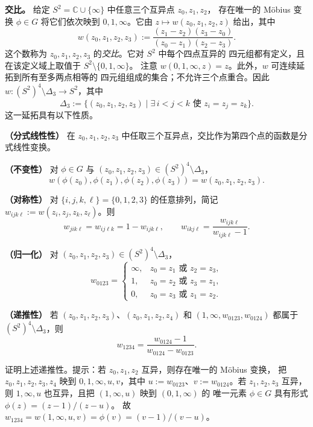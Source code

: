 \noindent\textbf{交比。}
给定 $S^2=\mathbb C\cup\{\infty\}$ 中任意三个互异点 $z_0,z_1,z_2$，
存在唯一的 Möbius 变换 $\phi\in G$ 将它们依次映到 $0,1,\infty$。它由
$z\mapsto w(z_0,z_1,z_2,z)$ 给出，其中
\[
  w(z_0,z_1,z_2,z_3):=
  \frac{(z_1-z_2)(z_3-z_0)}{(z_0-z_1)(z_2-z_3)}.
\]
这个数称为 $z_0,z_1,z_2,z_3$ 的\emph{交比}。它对 $S^2$ 中每个四点互异的
四元组都有定义，且在该定义域上取值于 $S^2\setminus\{0,1,\infty\}$。
注意 $w(0,1,\infty,z)=z$。此外，$w$ 可连续延拓到所有至多两点相等的
四元组组成的集合；不允许三个点重合。因此
$w:(S^2)^4\setminus\Delta_3\to S^2$，其中
\[
  \Delta_3:=\{(z_0,z_1,z_2,z_3)\mid
    \exists\, i<j<k\text{ 使 }z_i=z_j=z_k\}.
\]
这一延拓具有以下性质。

\noindent\textbf{（分式线性性）}
在 $z_0,z_1,z_2,z_3$ 中任取三个互异点，交比作为第四个点的函数是分式线性变换。

\noindent\textbf{（不变性）}
对 $\phi\in G$ 与 $(z_0,z_1,z_2,z_3)\in(S^2)^4\setminus\Delta_3$，
\[
  w(\phi(z_0),\phi(z_1),\phi(z_2),\phi(z_3))=w(z_0,z_1,z_2,z_3).
\]

\noindent\textbf{（对称性）}
对 $\{i,j,k,\ell\}=\{0,1,2,3\}$ 的任意排列，简记
$w_{ijk\ell}:=w(z_i,z_j,z_k,z_\ell)$。则
\begin{equation}\label{eq:D-1-1}
  w_{jik\ell}=w_{ij\ell k}=1-w_{ijk\ell},\qquad
  w_{ikj\ell}=\frac{w_{ijk\ell}}{w_{ijk\ell}-1}.
\end{equation}

\noindent\textbf{（归一化）}
对 $(z_0,z_1,z_2,z_3)\in(S^2)^4\setminus\Delta_3$，
\begin{equation}\label{eq:D-1-2}
  w_{0123}=\begin{cases}
    \infty,&z_0=z_1\text{ 或 }z_2=z_3,\\
    1,&z_0=z_2\text{ 或 }z_3=z_1,\\
    0,&z_0=z_3\text{ 或 }z_1=z_2.
  \end{cases}
\end{equation}

\noindent\textbf{（递推性）}
若 $(z_0,z_1,z_2,z_3)$、$(z_0,z_1,z_2,z_4)$ 和
$(1,\infty,w_{0123},w_{0124})$ 都属于 $(S^2)^4\setminus\Delta_3$，则
\begin{equation}\label{eq:D-1-3}
  w_{1234}=\frac{w_{0124}-1}{w_{0124}-w_{0123}}.
\end{equation}

\begin{exercise}\label{ex:D-1-1}
证明上述递推性。提示：若 $z_0,z_1,z_2$ 互异，则存在唯一的 Möbius 变换，
把 $z_0,z_1,z_2,z_3,z_4$ 映到 $0,1,\infty,u,v$，其中
$u:=w_{0123}$、$v:=w_{0124}$。若 $z_1,z_2,z_3$ 互异，
则 $1,\infty,u$ 也互异，且把 $(1,\infty,u)$ 映到 $(0,1,\infty)$ 的
唯一元素 $\phi\in G$ 具有形式 $\phi(z)=(z-1)/(z-u)$。
故 $w_{1234}=w(1,\infty,u,v)=\phi(v)=(v-1)/(v-u)$。
\end{exercise}

